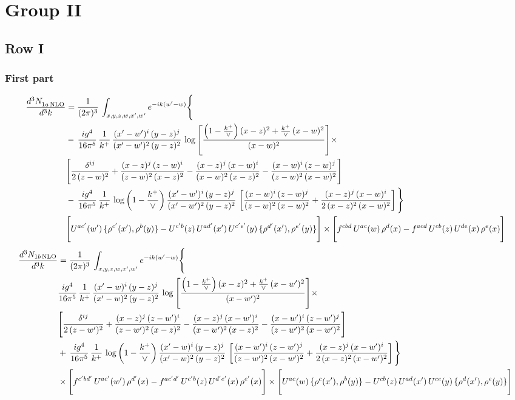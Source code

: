 \documentclass[9pt]{article}
\numberwithin{equation}{section}
\begin{document}
\section{Group II}
\subsection{Row I}
\subsubsection{First part}
\begin{align}
 \frac{d^{3}N_{1a\,\rm NLO}^{\rm}}{d^{3}k}  & =     \frac{1}{(2\pi)^{3}}\,\int_{x,y,z,w,x',w^{\prime}} e^{-ik(w^{\prime}-w)}\Bigg\{\notag \\
& -\, \frac{ig^{4}}{16\pi^{5}}\,\frac{1}{k^{+}}\, \frac{(x'-w')^{i}\,(y-z)^{j}}{(x'-w')^{2}\,(y-z)^{2}}\,\log{\left[\frac{\left(1-\frac{k^{+}}{\vee}\right)(x-z)^{2}+\frac{k^{+}}{\vee}\,(x-w)^{2}}{(x-w)^{2}}\right]}\times\notag \\ &  \Bigg[\frac{\delta^{ij}}{2\,(z-w)^{2}}+\frac{(x-z)^{j}\,(z-w)^{i}}{(z-w)^{2}\,(x-z)^{2}}-\frac{(x-z)^{j}\,(x-w)^{i}}{(x-w)^{2}\,(x-z)^{2}}-\frac{(x-w)^{i}\,(z-w)^{j}}{(z-w)^{2}\,(x-w)^{2}}\Bigg] \notag \\
& -\, \frac{ig^{4}}{16\pi^{5}}\,\frac{1}{k^{+}}\,\log{\left(1-\frac{k^{+}}{\vee}\right)}\,\frac{(x'-w')^{i}\,(y-z)^{j}}{(x'-w')^{2}\,(y-z)^{2}}\,\left[\frac{(x-w)^{i}\,(z-w)^{j}}{(z-w)^{2}\,(x-w)^{2}}+\frac{(x-z)^{j}\,(x-w)^{i}}{2\,(x-z)^{2}\, (x-w)^{2}}\right]\Bigg\} \notag \\ & \Bigg[U^{ac'}(w')\,\{\rho^{c'}(x'),\rho^{b}(y)\}-U^{c'b}(z)\,U^{ad'}(x')\,U^{c'e'}(y)\, \{\rho^{d'}(x'),\rho^{e'}(y)\}\Bigg]\times \Bigg[f^{cbd}\,U^{ac}(w)\,\rho^{d}(x)-f^{acd}\, U^{cb}(z)\,U^{de}(x)\,\rho^{e}(x)\Bigg]
\end{align}
\begin{align}
\frac{d^{3}N_{1b\, \rm NLO}}{d^{3}k} & =  \frac{1}{(2\pi)^{3}}\,\int_{x,y,z,w,x',w^{\prime}} e^{-ik(w^{\prime}-w)}\Bigg\{\notag \\
&  \frac{ig^{4}}{16\pi^{5}}\,\frac{1}{k^{+}}\, \frac{(x'-w)^{i}\,(y-z)^{j}}{(x'-w)^{2}\,(y-z)^{2}}\,\log{\left[\frac{\left(1-\frac{k^{+}}{\vee}\right)(x-z)^{2}+\frac{k^{+}}{\vee}\,(x-w')^{2}}{(x-w')^{2}}\right]}\times\notag \\ &  \Bigg[\frac{\delta^{ij}}{2\,(z-w')^{2}}+\frac{(x-z)^{j}\,(z-w')^{i}}{(z-w')^{2}\,(x-z)^{2}}-\frac{(x-z)^{j}\,(x-w')^{i}}{(x-w')^{2}\,(x-z)^{2}}-\frac{(x-w')^{i}\,(z-w')^{j}}{(z-w')^{2}\,(x-w')^{2}}\Bigg] \notag \\
& +\,\frac{ig^{4}}{16\pi^{5}}\,\frac{1}{k^{+}}\,\log{\left(1-\frac{k^{+}}{\vee}\right)}\,\frac{(x'-w)^{i}\,(y-z)^{j}}{(x'-w)^{2}\,(y-z)^{2}}\,\left[\frac{(x-w')^{i}\,(z-w')^{j}}{(z-w')^{2}\,(x-w')^{2}}+\frac{(x-z)^{j}\,(x-w')^{i}}{2\,(x-z)^{2}\, (x-w')^{2}}\right]\Bigg\} \notag \\ & \times\Bigg[f^{c'bd'}\,U^{ac'}(w')\,\rho^{d'}(x)-f^{ac'd'}\, U^{c'b}(z)\,U^{d'e'}(x)\,\rho^{e'}(x)\Bigg] \times \Bigg[U^{ac}(w)\,\{\rho^{c}(x'),\rho^{b}(y)\}-U^{cb}(z)\,U^{ad}(x')\,U^{ce}(y)\, \{\rho^{d}(x'),\rho^{e}(y)\}\Bigg]
\end{align}
\end{document}
